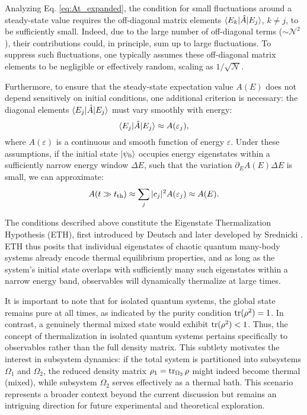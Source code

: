 Analyzing Eq. \eqref{eq:At_expanded}, the condition for small fluctuations around a steady-state value requires the off-diagonal matrix elements $\bk{E_k}[\hat{A}]{E_j}$, $k\neq j$, to be sufficiently small. Indeed, due to the large number of off-diagonal terms ($\sim \mathcal{N}^2$), their contributions could, in principle, sum up to large fluctuations. To suppress such fluctuations, one typically assumes these off-diagonal matrix elements to be negligible or effectively random, scaling as $1/\sqrt{\mathcal{N}}$.

Furthermore, to ensure that the steady-state expectation value $A(E)$ does not depend sensitively on initial conditions, one additional criterion is necessary: the diagonal elements $\bk{E_j}[\hat{A}]{E_j}$ must vary smoothly with energy:
\begin{equation*}
\bk{E_j}[\hat{A}]{E_j} \approx A(\varepsilon_j),
\end{equation*}
where $A(\varepsilon)$ is a continuous and smooth function of energy $\varepsilon$. Under these assumptions, if the initial state $\left| \psi_0 \right\rangle$ occupies energy eigenstates within a sufficiently narrow energy window $\Delta E$, such that the variation $\partial_E A(E)\Delta E$ is small, we can approximate:
\begin{equation*}
A(t \gg t_{\textnormal{th}}) \approx \sum_j |c_j|^2 A(\varepsilon_j) \approx A(E).
\end{equation*}

The conditions described above constitute the Eigenstate Thermalization Hypothesis (ETH), first introduced by Deutsch \cite{deutsch_quantum_1991} and later developed by Srednicki \cite{srednicki_chaos_1994}. ETH thus posits that individual eigenstates of chaotic quantum many-body systems already encode thermal equilibrium properties, and as long as the system's initial state overlaps with sufficiently many such eigenstates within a narrow energy band, observables will dynamically thermalize at large times.

It is important to note that for isolated quantum systems, the global state remains pure at all times, as indicated by the purity condition $\mathop{\mathrm{tr}}\nolimits(\rho^2) = 1$. In contrast, a genuinely thermal mixed state would exhibit $\mathop{\mathrm{tr}}\nolimits(\rho^2) < 1$. Thus, the concept of thermalization in isolated quantum systems pertains specifically to observables rather than the full density matrix. This subtlety motivates the interest in subsystem dynamics: if the total system is partitioned into subsystems $\Omega_1$ and $\Omega_2$, the reduced density matrix $\rho_1 = \mathop{\mathrm{tr}}\nolimits_{\Omega_2} \rho$ might indeed become thermal (mixed), while subsystem $\Omega_2$ serves effectively as a thermal bath. This scenario represents a broader context beyond the current discussion but remains an intriguing direction for future experimental and theoretical exploration.

